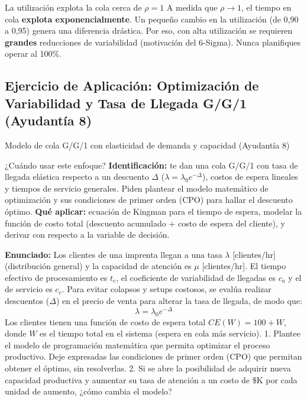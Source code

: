 \begin{trampa}{La utilización explota la cola cerca de $\rho=1$}
A medida que $\rho \to 1$, el tiempo en cola \textbf{explota exponencialmente}. Un pequeño cambio en la utilización (de 0,90 a 0,95) genera una diferencia drástica. Por eso, con alta utilización se requieren \textbf{grandes} reducciones de variabilidad (motivación del 6-Sigma). Nunca planifiques operar al 100\%.
\end{trampa}


\subsection[Variabilidad: Optimización G/G/1]{Ejercicio de Aplicación: Optimización de Variabilidad y Tasa de Llegada G/G/1 (Ayudantía 8)}

\begin{ejercicio}{Modelo de cola G/G/1 con elasticidad de demanda y capacidad (Ayudantía 8)}
\begin{tipprueba}{¿Cuándo usar este enfoque?}
\textbf{Identificación:} te dan una cola G/G/1 con tasa de llegada elástica respecto a un descuento $\Delta$ ($\lambda = \lambda_0 e^{-\Delta}$), costos de espera lineales y tiempos de servicio generales. Piden plantear el modelo matemático de optimización y sus condiciones de primer orden (CPO) para hallar el descuento óptimo.
\textbf{Qué aplicar:} ecuación de Kingman para el tiempo de espera, modelar la función de costo total (descuento acumulado + costo de espera del cliente), y derivar con respecto a la variable de decisión.
\end{tipprueba}

\textbf{Enunciado:}
Los clientes de una imprenta llegan a una tasa $\lambda$ [clientes/hr] (distribución general) y la capacidad de atención es $\mu$ [clientes/hr]. El tiempo efectivo de procesamiento es $t_e$, el coeficiente de variabilidad de llegadas es $c_a$ y el de servicio es $c_e$. Para evitar colapsos y setups costosos, se evalúa realizar descuentos ($\Delta$) en el precio de venta para alterar la tasa de llegada, de modo que:
$$\lambda = \lambda_0 e^{-\Delta}$$
Los clientes tienen una función de costo de espera total $CE(W) = 100 + W$, donde $W$ es el tiempo total en el sistema (espera en cola más servicio).
1. Plantee el modelo de programación matemática que permita optimizar el proceso productivo. Deje expresadas las condiciones de primer orden (CPO) que permitan obtener el óptimo, sin resolverlas.
2. Si se abre la posibilidad de adquirir nueva capacidad productiva y aumentar su tasa de atención a un costo de \$K por cada unidad de aumento, ¿cómo cambia el modelo?


\end{ejercicio}
